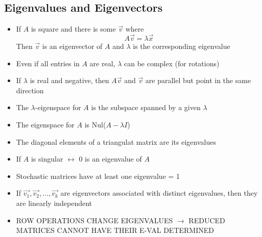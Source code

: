 \documentclass{article}
\begin{document}
\subsection{Eigenvalues and Eigenvectors}
\begin{itemize}
    \item If \(A\) is square and there is some \(\vec{v}\) where \[A\vec{v}=\lambda\vec{x}\] Then \(\vec{v}\) is an eigenvector of \(A\) and \(\lambda\) is the corresponding eigenvalue 
    \item Even if all entries in \(A\) are real, \(\lambda\) can be complex (for rotations)
    \item If \(\lambda\) is real and negative, then \(A\vec{v}\) and \(\vec{v}\) are parallel but point in the same direction 
    \item The \(\lambda\)-eigenspace for \(A\) is the subspace spanned by a given \(\lambda\) 
    \item The eigenspace for \(A\) is Nul(\(A-\lambda I\)) 
    \item The diagonal elements of a triangulat matrix are its eigenvalues 
    \item If \(A\) is singular \(\leftrightarrow\) 0 is an eigenvalue of \(A\) 
    \item Stochastic matrices have at least one eigenvalue = 1 
    \item If \(\vec{v_1},\vec{v_2},\dots,\vec{v_k}\) are eigenvectors associated with distinct eigenvalues, then they are linearly independent 
    \item ROW OPERATIONS CHANGE EIGENVALUES \(\rightarrow\) REDUCED MATRICES CANNOT HAVE THEIR E-VAL DETERMINED 
\end{itemize}
\end{document}
